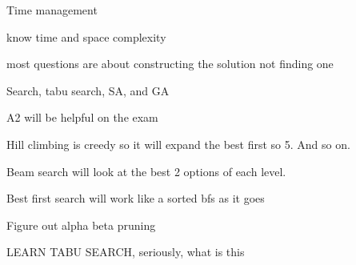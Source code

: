 \documentclass[12pt]{article}
\begin{document}
	Time management

	know time and space complexity

	most questions are about constructing the solution not finding one

	Search, tabu search, SA, and GA

	A2 will be helpful on the exam


Hill climbing is creedy so it will expand the best first so 5. And so on.

Beam search will look at the best 2 options of each level. 

Best first search will work like a sorted bfs as it goes 



Figure out alpha beta pruning




LEARN TABU SEARCH, seriously, what is this


\end{document}
